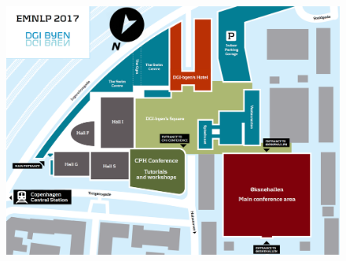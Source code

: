 

\begin{figure}[p]
\centering
\includegraphics[height=\textwidth,angle=90,origin=c]{content/venue_map_small.png}
\end{figure}

